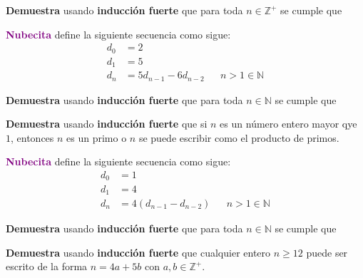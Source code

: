 \documentclass[oneside]{style}
\begin{document}
\begin{questions}[label=\protect\circled{\bfseries\arabic*}]
    \question
    {
        \textbf{Demuestra} usando \textbf{inducción fuerte} que para toda 
        $n \in \mathbb{Z}^+$ se cumple que 
        \begin{center}
        \end{center} 
    }

    \question
    {
        \textcolor{purple}{\textbf{Nubecita}} define la siguiente secuencia 
        como sigue:
        \begin{align*}
            d_0 &= 2 \\ 
            d_1 &= 5 \\ 
            d_{n} &= 5d_{n-1} - 6d_{n-2} 
            && n > 1 \in \mathbb{N}
        \end{align*}

        \textbf{Demuestra} usando \textbf{inducción fuerte} que para toda 
        $n \in \mathbb{N}$ se cumple que 
        \begin{center}
        \end{center}    
    }

    \question
    {
        \textbf{Demuestra} usando \textbf{inducción fuerte} que si $n$ es un 
        número entero mayor qye $1$, entonces $n$ es un primo o $n$ se puede 
        escribir como el producto de primos. 
    }

    \newpage
    \question
    {
        \textcolor{purple}{\textbf{Nubecita}} define la siguiente secuencia 
        como sigue:
        \begin{align*}
            d_0 &= 1 \\ 
            d_1 &= 4 \\ 
            d_{n} &= 4(d_{n-1} - d_{n-2}) 
            && n > 1 \in \mathbb{N}
        \end{align*}

        \textbf{Demuestra} usando \textbf{inducción fuerte} que para toda 
        $n \in \mathbb{N}$ se cumple que 
        \begin{center}
        \end{center}   
    }

    \question
    {
        \textbf{Demuestra} usando \textbf{inducción fuerte} que cualquier entero 
        $n \geq 12$ puede ser escrito de la forma $n = 4a + 5b$ con $a,b \in 
        \mathbb{Z}^+$.
    }


\end{questions}
\end{document}

